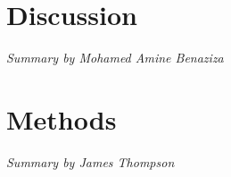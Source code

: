 \documentclass[conference,a4paper]{IEEEtran}
\begin{document}
\section*{Discussion}
\textit{Summary by Mohamed Amine Benaziza}

\section*{Methods}
\textit{Summary by James Thompson}




\appendix
\end{document}

